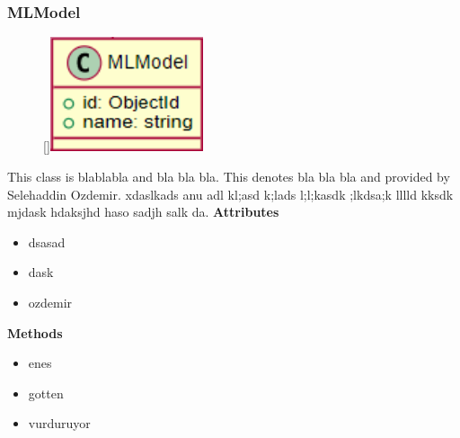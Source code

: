 \subsubsection{MLModel}
\begin{figure}
    \raisebox{0pt}[\dimexpr{}\baselineskip\relax]{\includegraphics[width=4.5cm]{classes/model-management/4.png}}
\end{figure} 
\par
This class is blablabla and bla bla bla. This denotes bla bla bla and provided by Selehaddin Ozdemir. xdaslkads anu adl kl;asd k;lads l;l;kasdk ;lkdsa;k lllld kksdk mjdask hdaksjhd haso sadjh salk da.
\newline
\newline
\textbf{Attributes}
\begin{itemize}
    \item dsasad
    \item dask
    \item ozdemir
\end{itemize}
\textbf{Methods}
\begin{itemize}
    \item enes
    \item gotten
    \item vurduruyor
\end{itemize}

